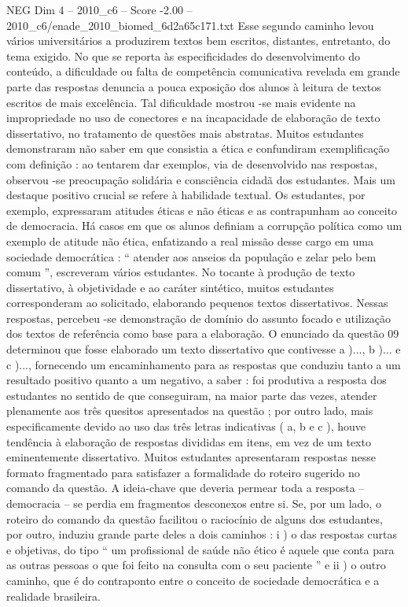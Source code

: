 \begin{textsample}{NEG Dim 4 – 2010\_c6 – Score -2.00 – 2010\_c6/enade\_2010\_biomed\_6d2a65c171.txt}
Esse segundo caminho levou vários universitários a produzirem textos bem escritos, distantes, entretanto, do tema exigido.
No que se reporta às especificidades do desenvolvimento do conteúdo, a dificuldade ou falta de competência comunicativa revelada em grande parte das respostas denuncia a pouca exposição dos alunos à leitura de textos escritos de mais excelência.
Tal dificuldade mostrou -se mais evidente na impropriedade no uso de conectores e na incapacidade de elaboração de texto dissertativo, no tratamento de questões mais abstratas.
Muitos estudantes demonstraram não saber em que consistia a ética e confundiram exemplificação com definição : ao tentarem dar exemplos, via de desenvolvido nas respostas, observou -se preocupação solidária e consciência cidadã dos estudantes.
Mais um destaque positivo crucial se refere à habilidade textual.
Os estudantes, por exemplo, expressaram atitudes éticas e não éticas e as contrapunham ao conceito de democracia.
Há casos em que os alunos definiam a corrupção política como um exemplo de atitude não ética, enfatizando a real missão desse cargo em uma sociedade democrática : “ atender aos anseios da população e zelar pelo bem comum ”, escreveram vários estudantes.
No tocante à produção de texto dissertativo, à objetividade e ao caráter sintético, muitos estudantes corresponderam ao solicitado, elaborando pequenos textos dissertativos.
Nessas respostas, percebeu -se demonstração de domínio do assunto focado e utilização dos textos de referência como base para a elaboração.
O enunciado da questão 09 determinou que fosse elaborado um texto dissertativo que contivesse a )..., b )... e c )..., fornecendo um encaminhamento para as respostas que conduziu tanto a um resultado positivo quanto a um negativo, a saber : foi produtiva a resposta dos estudantes no sentido de que conseguiram, na maior parte das vezes, atender plenamente aos três quesitos apresentados na questão ; por outro lado, mais especificamente devido ao uso das três letras indicativas ( a, b e c ), houve tendência à elaboração de respostas divididas em itens, em vez de um texto eminentemente dissertativo.
Muitos estudantes apresentaram respostas nesse formato fragmentado para satisfazer a formalidade do roteiro sugerido no comando da questão.
A ideia-chave que deveria permear toda a resposta – democracia – se perdia em fragmentos desconexos entre si.
Se, por um lado, o roteiro do comando da questão facilitou o raciocínio de alguns dos estudantes, por outro, induziu grande parte deles a dois caminhos : i ) o das respostas curtas e objetivas, do tipo “ um profissional de saúde não ético é aquele que conta para as outras pessoas o que foi feito na consulta com o seu paciente ” e ii ) o outro caminho, que é do contraponto entre o conceito de sociedade democrática e a realidade brasileira.

\end{textsample}
